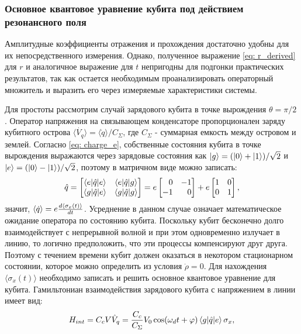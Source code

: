 \subsubsection{Основное квантовое уравнение кубита под действием резонансного поля}
Амплитудные коэффициенты отражения и прохождения достаточно удобны для их непосредственного измерения. Однако, полученное выражение \eqref{eq: r_derived} для $r$ и аналогичное выражение для $t$ непригодны для подгонки практических результатов, так как остается необходимым проанализировать операторный множитель и выразить его через измеряемые характеристики системы. 

Для простоты рассмотрим случай зарядового кубита в точке вырождения $\theta=\pi/2$ . Оператор напряжения на связывающем конденсаторе пропорционален заряду кубитного острова $\langle \dot{V_q} \rangle=\langle \dot{q} \rangle/C_\Sigma$, где $C_\Sigma$ - суммарная емкость между островом и землей. 
Согласно \eqref{eq: charge_e}, собственные состояния кубита в точке вырождения выражаются через зарядовые состояния как $\ket{g} = (\ket{0}+\ket{1})/\sqrt{2}$ и $\ket{e} = (\ket{0}-\ket{1})/\sqrt{2}$, поэтому в матричном виде можно записать:
\begin{equation}
\hat{q} = 
\begin{bmatrix}
\braket{e|\hat{q}|e} & \braket{e|\hat{q}|g} \\
\braket{g|\hat{q}|e} & \braket{g|\hat{q}|g}
\end{bmatrix} = e
\begin{bmatrix*}[r]
 0 &-1 \\
-1 & 0
\end{bmatrix*} + e
\begin{bmatrix*}[r]
1 & 0 \\
0 & 1
\end{bmatrix*}, 
\end{equation}
значит, $\braket{\dot{q}}=e\frac{d\braket{\sigma_x(t)}}{dt}$. Усреднение в данном случае означает математическое ожидание оператора по состоянию кубита. Поскольку кубит бесконечно долго взаимодействует с непрерывной волной и при этом одновременно излучает в линию, то логично предположить, что эти процессы компенсируют друг друга. Поэтому с течением времени кубит должен оказаться в некотором стационарном состоянии, которое можно определить из условия $\dot{\rho} = 0$. Для нахождения $\langle\sigma_x(t)\rangle$ необходимо записать и решить основное квантовое уравнение для кубита. Гамильтониан взаимодействия зарядового кубита с напряжением в линии имеет вид:
\begin{equation}
H_{int} = C_cV\hat{V}_q = \frac{C_c}{C_\Sigma}V_0\cos(\omega_d t + \varphi)\braket{g|\hat{q}|e}\sigma_x,
\label{eq: Hint_class}
\end{equation} 
